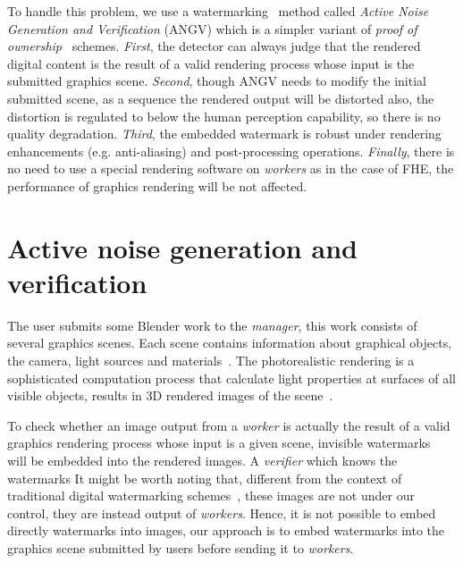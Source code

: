 \documentclass[a4paper,11pt,onecolumn]{memoir}
\begin{document}
To handle this problem, we use a watermarking~\cite{Cox1997,Cox1999} method called \emph{Active Noise Generation and Verification} (ANGV) which is a simpler variant of \emph{proof of ownership}~\cite{Craver1997} schemes. \emph{First}, the detector can always judge that the rendered digital content is the result of a valid rendering process whose input is the submitted graphics scene. \emph{Second}, though ANGV needs to modify the initial submitted scene, as a sequence the rendered output will be distorted also, the distortion is regulated to below the human perception capability, so there is no quality degradation. \emph{Third}, the embedded watermark is robust under rendering enhancements (e.g. anti-aliasing) and post-processing operations. \emph{Finally}, there is no need to use a special rendering software on \emph{workers} as in the case of FHE, the performance of graphics rendering will be not affected.


\section[Active noise generation and verification]{Active noise generation and verification}
The user submits some Blender work to the \emph{manager}, this work consists of several graphics scenes. Each scene contains information about graphical objects, the camera, light sources and materials~\cite{Blender}. The photorealistic rendering is a sophisticated computation process that calculate light properties at surfaces of all visible objects, results in 3D rendered images of the scene~\cite{Hughes2014}.

To check whether an image output from a \emph{worker} is actually the result of a valid graphics rendering process whose input is a given scene, invisible watermarks~\cite{Craver1997} will be embedded into the rendered images. A \emph{verifier} which knows the watermarks  It might be worth noting that, different from the context of traditional digital watermarking schemes~\cite{Cox2008}, these images are not under our control, they are instead output of \emph{workers}. Hence, it is not possible to embed directly watermarks into images, our approach is to embed watermarks into the graphics scene submitted by users before sending it to \emph{workers}.
\end{document}
